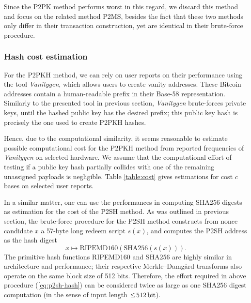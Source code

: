 \documentclass[a4paper,11pt,titlepage]{scrbook}
\begin{document}
Since the P2PK method performs worst in this regard, we discard this method and focus on the related method P2MS, besides the fact that these two methods only differ in their transaction construction, yet are identical in their brute-force procedure.

\subsubsection*{Hash cost estimation}
For the {P2PKH} method, we can rely on user reports on their performance using the tool \emph{Vanitygen}, which allows users to create vanity addresses.
These Bitcoin addresses contain a human-readable prefix in their Base-58 representation.
Similarly to the presented tool in previous section, \emph{Vanitygen} brute-forces private keys, until the hashed public key has the desired prefix;
this public key hash is precisely the one used to create {P2PKH} hashes.

Hence, due to the computational similarity, it seems reasonable to estimate possible computational cost for the {P2PKH} method from reported frequencies of \emph{Vanitygen} on selected hardware.
We assume that the computational effort of testing if a public key hash partially collides with one of the remaining unassigned payloads is negligible.
Table \ref{table:cost} gives estimations for cost $c$ bases on selected user reports.

In a similar matter, one can use the performances in computing {SHA256} digests as estimation for the cost of the {P2SH} method.
As was outlined in previous section, the brute-force procedure for the {P2SH} method constructs from nonce candidate $x$ a 57-byte long redeem script $s(x)$, and computes the {P2SH} address as the hash digest 
\begin{equation}
    x \mapsto \text{{RIPEMD160}}(\text{{SHA256}}(s(x))).\label{eq:p2sh-hash}
\end{equation}
The primitive hash functions {RIPEMD160} and {SHA256} are highly similar in architecture and performance; their respective Merkle–Damgård transforms also operate on the same block size of 512 bits.
Therefore, the effort required in above procedure (\ref{eq:p2sh-hash}) can be considered twice as large as one {SHA256} digest computation (in the sense of input length $\leq\!\SI{512}{\bit}$). 
\end{document}
